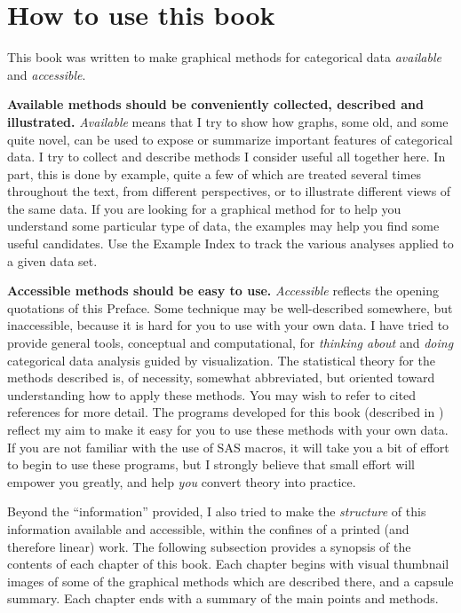\section*{How to use this book}
\begin{changebar}
This book was written to make graphical methods for categorical
data \emph{available} and \emph{accessible}.

\textbf{Available methods should be conveniently collected, described and illustrated.}
\emph{Available} means that I try to show how graphs, some old,
and some quite novel, can be used to expose or summarize important
features of categorical data.  
I try to collect
and describe methods I consider useful all together here.
In part, this is done by example,
quite a few of which are treated several times throughout the text,
from different perspectives, or to illustrate different views of the
same data.  If you are looking for a graphical method for to help
you understand some particular type of data, the examples may help
you find some useful candidates.  Use the Example Index to track
the various analyses applied to a given data set.

\textbf{Accessible methods should be easy to use.}  
\emph{Accessible} reflects the opening quotations of this Preface.
Some technique may be well-described somewhere, but inaccessible,
because it is hard for you to use with your own data.
I have tried to provide general tools, conceptual and computational,
for \emph{thinking about} and \emph{doing} categorical data analysis
guided by visualization.  The statistical theory for the methods
described is, of necessity, somewhat abbreviated, but oriented toward
understanding how to apply these methods.  You may wish to refer to
cited references for more detail.  The programs developed for this
book (described in ) reflect my aim to make it easy
for you to use these methods with your own data.  If you are not familiar
with the use of SAS macros, it will take you a bit of effort to begin
to use these programs, but I strongly believe that small effort will
empower you greatly, and help \emph{you} convert theory into practice.

Beyond the ``information'' provided, I also tried to make the \emph{structure}
of this information available and accessible, within the confines of
a printed (and therefore linear) work.
The following subsection provides a synopsis of the contents of each chapter of
this book.
Each chapter begins with visual thumbnail images of some of the
graphical methods which are described there, and a capsule summary.  
Each chapter ends with a
summary of the main points and methods.  
\end{changebar}

